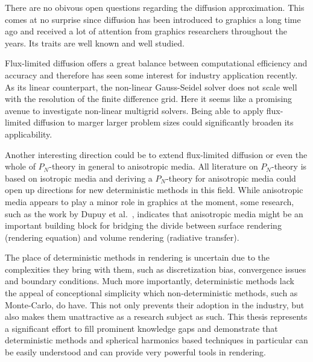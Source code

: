 There are no obivous open questions regarding the diffusion approximation. This comes at no surprise since diffusion has been introduced to graphics a long time ago and received a lot of attention from graphics researchers throughout the years. Its traits are well known and well studied.

Flux-limited diffusion offers a great balance between computational efficiency and accuracy and therefore has seen some interest for industry application recently. As its linear counterpart, the non-linear Gauss-Seidel solver does not scale well with the resolution of the finite difference grid. Here it seems like a promising avenue to investigate non-linear multigrid solvers. Being able to apply flux-limited diffusion to marger larger problem sizes could significantly broaden its applicability.

Another interesting direction could be to extend flux-limited diffusion or even the whole of $P_N$-theory in general to anisotropic media. All literature on $P_N$-theory is based on isotropic media and deriving a $P_N$-theory for anisotropic media could open up directions for new deterministic methods in this field. While anisotropic media appears to play a minor role in graphics at the moment, some research, such as the work by Dupuy et al.~\cite{Dupuy16}, indicates that anisotropic media might be an important building block for bridging the divide between surface rendering (rendering equation) and volume rendering (radiative transfer).

The place of deterministic methods in rendering is uncertain due to the complexities they bring with them, such as discretization bias, convergence issues and boundary conditions. Much more importantly, deterministic methods lack the appeal of conceptional simplicity which non-deterministic methods, such as Monte-Carlo, do have. This not only prevents their adoption in the industry, but also makes them unattractive as a research subject as such. This thesis represents a significant effort to fill prominent knowledge gaps and demonstrate that deterministic methods and spherical harmonics based techniques in particular can be easily understood and can provide very powerful tools in rendering.







